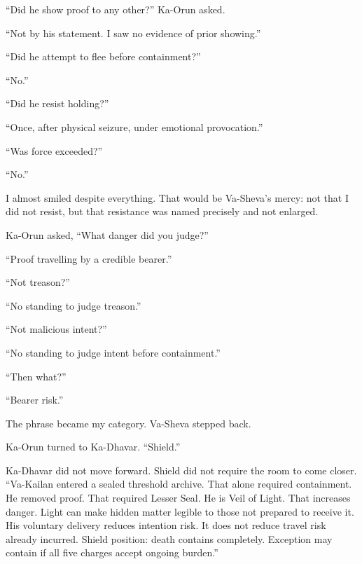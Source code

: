 ``Did he show proof to any other?'' Ka-Orun asked.\par

``Not by his statement. I saw no evidence of prior showing.''\par

``Did he attempt to flee before containment?''\par

``No.''\par

``Did he resist holding?''\par

``Once, after physical seizure, under emotional provocation.''\par

``Was force exceeded?''\par

``No.''\par

I almost smiled despite everything. That would be Va-Sheva's mercy: not that I did not resist, but that resistance was named precisely and not enlarged.\par

Ka-Orun asked, ``What danger did you judge?''\par

``Proof travelling by a credible bearer.''\par

``Not treason?''\par

``No standing to judge treason.''\par

``Not malicious intent?''\par

``No standing to judge intent before containment.''\par

``Then what?''\par

``Bearer risk.''\par

The phrase became my category. Va-Sheva stepped back.\par

Ka-Orun turned to Ka-Dhavar. ``Shield.''\par

Ka-Dhavar did not move forward. Shield did not require the room to come closer. ``Va-Kailan entered a sealed threshold archive. That alone required containment. He removed proof. That required Lesser Seal. He is Veil of Light. That increases danger. Light can make hidden matter legible to those not prepared to receive it. His voluntary delivery reduces intention risk. It does not reduce travel risk already incurred. Shield position: death contains completely. Exception may contain if all five charges accept ongoing burden.''\par

